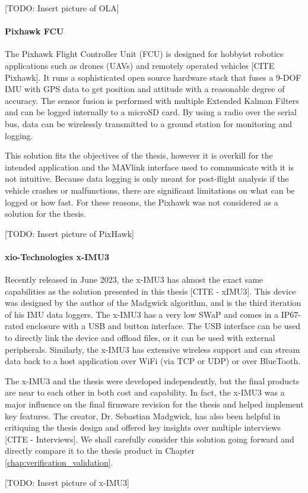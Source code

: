 [TODO: Insert picture of OLA]

\paragraph*{Pixhawk FCU} The Pixhawk Flight Controller Unit (FCU) is designed for hobbyist robotics applications such as drones (UAVs) and remotely operated vehicles [CITE Pixhawk].
It runs a sophisticated open source hardware stack that fuses a 9-DOF IMU with GPS data to get position and attitude with a reasonable degree of accuracy.
The sensor fusion is performed with multiple Extended Kalman Filters and can be logged internally to a microSD card.
By using a radio over the serial bus, data can be wirelessly transmitted to a ground station for monitoring and logging.

This solution fits the objectives of the thesis, however it is overkill for the intended application and the MAVlink interface used to communicate with it is not intuitive.
Because data logging is only meant for post-flight analysis if the vehicle crashes or malfunctions, there are significant limitations on what can be logged or how fast.
For these reasons, the Pixhawk was not considered as a solution for the thesis.

[TODO: Insert picture of PixHawk]

\paragraph*{xio-Technologies x-IMU3} Recently released in June 2023, the x-IMU3 has almost the exact same capabilities as the solution presented in this thesis [CITE - xIMU3].
This device was designed by the author of the Madgwick algorithm, and is the third iteration of his IMU data loggers.
The x-IMU3 has a very low SWaP and comes in a IP67-rated enclosure with a USB and button interface.
The USB interface can be used to directly link the device and offload files, or it can be used with external peripherals.
Similarly, the x-IMU3 has extensive wireless support and can stream data back to a host application over WiFi (via TCP or UDP) or over BlueTooth.

The x-IMU3 and the thesis were developed independently, but the final products are near to each other in both cost and capability.
In fact, the x-IMU3 was a major influence on the final firmware revision for the thesis and helped implement key features.
The creator, Dr. Sebastian Madgwick, has also been helpful in critiquing the thesis design and offered key insights over multiple interviews [CITE - Interviews].
We shall carefully consider this solution going forward and directly compare it to the thesis product in Chapter \ref{chap:verification_validation}.

[TODO: Insert picture of x-IMU3]